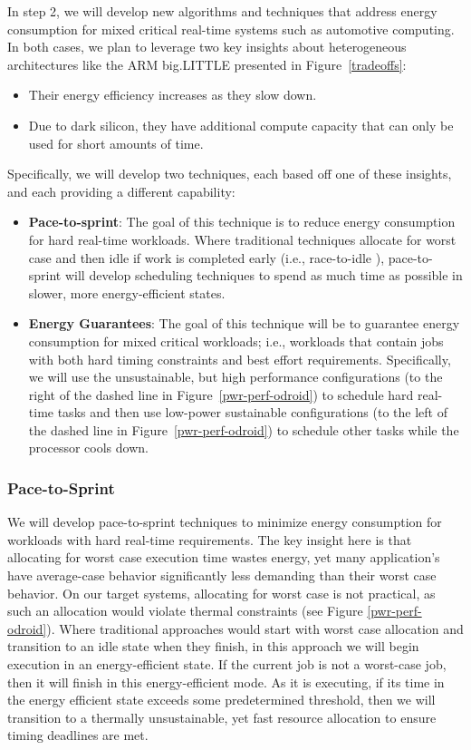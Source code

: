 In step 2, we will develop new algorithms and techniques that address
energy consumption for mixed critical real-time systems such as
automotive computing.  In both cases, we plan to leverage two key
insights about heterogeneous architectures like the ARM big.LITTLE
presented in Figure~\ref{tradeoffs}:
\begin{itemize}
\item Their energy efficiency increases as they slow down.
\item Due to dark silicon, they have additional compute capacity that
  can only be used for short amounts of time.
\end{itemize}

Specifically, we will develop two techniques, each based off one of
these insights, and each providing a different capability:
\begin{itemize}
\item \textbf{Pace-to-sprint}: The goal of this technique is to reduce
  energy consumption for hard real-time workloads.  Where traditional
  techniques allocate for worst case and then idle if work is
  completed early (i.e., race-to-idle
  \cite{Carroll13,LeSueur11,Imes2014,HotPower}), pace-to-sprint will
  develop scheduling techniques to spend as much time as possible in
  slower, more energy-efficient states.
\item \textbf{Energy Guarantees}: The goal of this technique will be
  to guarantee energy consumption for mixed critical workloads; i.e.,
  workloads that contain jobs with both hard timing constraints and
  best effort requirements.  Specifically, we will use the
  unsustainable, but high performance configurations (to the right of
  the dashed line in Figure~\ref{pwr-perf-odroid}) to schedule hard
  real-time tasks and then use low-power sustainable configurations
  (to the left of the dashed line in Figure~\ref{pwr-perf-odroid}) to
  schedule other tasks while the processor cools down. 
\end{itemize}


\subsubsection{Pace-to-Sprint}
We will develop pace-to-sprint techniques to minimize energy
consumption for workloads with hard real-time requirements.  The key
insight here is that allocating for worst case execution time wastes
energy, yet many application's have average-case behavior
significantly less demanding than their worst case behavior.  On our
target systems, allocating for worst case is not practical, as such an
allocation would violate thermal constraints (see Figure
\ref{pwr-perf-odroid}).  Where traditional approaches would start with
worst case allocation and transition to an idle state when they
finish, in this approach we will begin execution in an
energy-efficient state.  If the current job is not a worst-case job,
then it will finish in this energy-efficient mode.  As it is
executing, if its time in the energy efficient state exceeds some
predetermined threshold, then we will transition to a thermally
unsustainable, yet fast resource allocation to ensure timing deadlines
are met.

